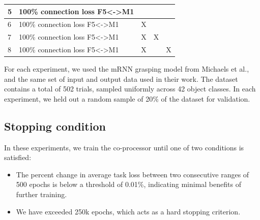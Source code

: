 \documentclass[12pt]{iopart}
\begin{document}
\begin{table}[h]
\begin{tabular}{|l|l|c|c|c|}
5              & 100\% connection loss F5\textless{}-\textgreater{}M1 &                                                                                                 &                                                                                                &                                                                                                 \\ \hline
6              & 100\% connection loss F5\textless{}-\textgreater{}M1 & X                                                                                               &                                                                                                &                                                                                                 \\ \hline
7              & 100\% connection loss F5\textless{}-\textgreater{}M1 & X                                                                                               & X                                                                                              &                                                                                                 \\ \hline
8              & 100\% connection loss F5\textless{}-\textgreater{}M1 & X                                                                                               &                                                                                                & X                                                                                               \\ \hline
\end{tabular}
\end{table}

For each experiment, we used the mRNN grasping model from Michaels et al.\cite{michaels.mrnn}, 
and the same set of input and output data used in their work. The dataset contains a total of
502 trials, sampled uniformly across 42 object classes. In each experiment, we held out 
a random sample of 20\% of the dataset for validation.

\subsection{Stopping condition}
In these experiments, we train the co-processor until one of two
conditions is satisfied:

\begin{itemize}
	\item The percent change in average task loss between two consecutive ranges of 500 epochs
	      is below a threshold of 0.01\%, indicating minimal benefits of further training. 
	\item We have exceeded 250k epochs, which acts as a hard stopping criterion. 
\end{itemize}
\end{document}
